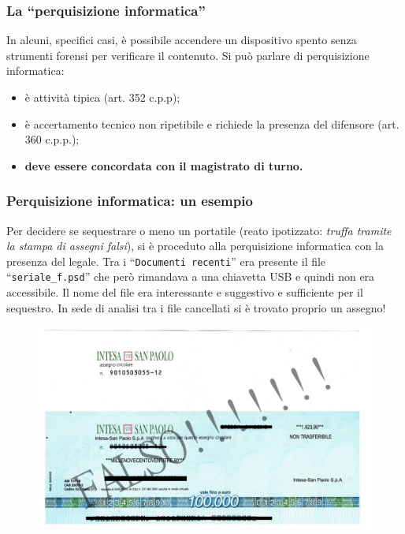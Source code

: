 \documentclass[11pt]{beamer}
\begin{document}
	\begin{frame} %
		\frametitle{La ``perquisizione informatica''}
		In alcuni, specifici casi, è possibile accendere un dispositivo spento senza strumenti forensi per verificare il contenuto. 
		\vfill
		Si può parlare di perquisizione informatica:
		\begin{itemize}
			\item è attività tipica (art. 352 c.p.p);
			\item è accertamento tecnico non ripetibile e richiede la presenza del difensore (art. 360 c.p.p.);
			\item \textbf{deve essere concordata con il magistrato di turno.}
		\end{itemize}
	\end{frame}
	

	
	\begin{frame}[shrink]
		\frametitle{Perquisizione informatica: un esempio}
		Per decidere se sequestrare o meno un portatile (reato ipotizzato: \textit{truffa tramite la stampa di assegni falsi}), si è proceduto alla perquisizione informatica con la presenza del legale.
		\vfill
		Tra i ``\texttt{Documenti recenti}'' era presente il file ``\texttt{seriale\_f.psd}'' che però rimandava a una chiavetta USB e quindi non era accessibile.
		\vfill
		Il nome del file era interessante e suggestivo e sufficiente per il sequestro. In sede di analisi tra i file cancellati si è trovato proprio un assegno!
		\begin{figure}
			\centering
			\includegraphics[width=0.6\textheight]{pics/assegno_psd}
			\label{fig:assegno_psd}
		\end{figure}
	\end{frame}
		
\end{document}

